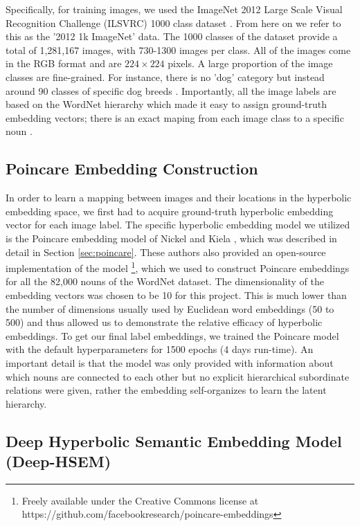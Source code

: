 \documentclass[12pt]{report}
\begin{document}
Specifically, for training images, we used the ImageNet 2012 Large Scale Visual Recognition Challenge (ILSVRC) 1000 class dataset \cite{Russakovsky2015, JiaDeng2009}. From here on we refer to this as the '2012 1k ImageNet' data. The 1000 classes of the dataset provide a total of 1,281,167 images, with 730-1300 images per class. All of the images come in the RGB format and are $224\times224$ pixels. A large proportion of the image classes are fine-grained. For instance, there is no 'dog' category but instead around 90 classes of specific dog breeds \cite{Russakovsky2015}. Importantly, all the image labels are based on the WordNet hierarchy which made it easy to assign ground-truth embedding vectors; there is an exact maping from each image class to a specific noun \cite{Russakovsky2015}.

\subsection{Poincare Embedding Construction}
In order to learn a mapping between images and their locations in the hyperbolic embedding space, we first had to acquire ground-truth hyperbolic embedding vector for each image label. The specific hyperbolic embedding model we utilized is the Poincare embedding model of Nickel and Kiela \cite{Nickel2017}, which was described in detail in Section \ref{sec:poincare}. These authors also provided an open-source implementation of the model \footnote{\label{fb_fn} Freely available under the Creative Commons license at https://github.com/facebookresearch/poincare-embeddings}, which we used to construct Poincare embeddings for all the 82,000 nouns of the WordNet dataset. The dimensionality of the embedding vectors was chosen to be 10 for this project. This is much lower than the number of dimensions usually used by Euclidean word embeddings (50 to 500) and thus allowed us to demonstrate the relative efficacy of hyperbolic embeddings. To get our final label embeddings, we trained the Poincare model with the default hyperparameters for 1500 epochs (4 days run-time). An important detail is that the model was only provided with information about which nouns are connected to each other but no explicit hierarchical subordinate relations were given, rather the embedding self-organizes to learn the latent hierarchy.

\subsection{Deep Hyperbolic Semantic Embedding Model \\ (Deep-HSEM)}
\end{document}
